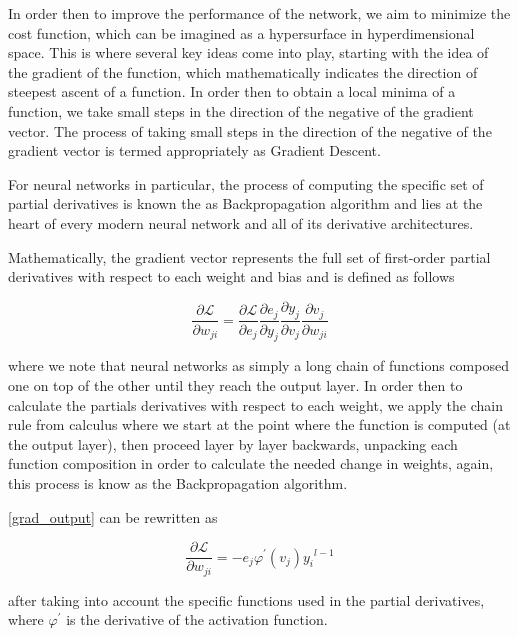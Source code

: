 \documentclass{article} %
\theoremstyle{definition}
\theoremstyle{remark}
\theoremstyle{plain}
\begin{document}
In order then to improve the performance of the network, we aim to minimize the cost function, which can be imagined as a hypersurface in hyperdimensional space. This is where several key ideas come into play, starting with the idea of the gradient of the function, which mathematically indicates the direction of steepest ascent of a function. In order then to obtain a local minima of a function, we take small steps in the direction of the negative of the gradient vector. The process of taking small steps in the direction of the negative of the gradient vector is termed appropriately as Gradient Descent.


For neural networks in particular, the process of computing the specific set of partial derivatives is known the as Backpropagation algorithm and lies at the heart of every modern neural network and all of its derivative architectures.


Mathematically, the gradient vector represents the full set of first-order partial derivatives with respect to each weight and bias and is defined as follows

\begin{equation}\label{grad_output}
	\frac{\partial \mathcal{L}}{\partial w_{j i}}=\frac{\partial \mathcal{L}}{\partial e_j} \frac{\partial e_j}{\partial y_j} \frac{\partial y_j}{\partial v_j} \frac{\partial v_j}{\partial w_{j i}}
\end{equation}

where we note that neural networks as simply a long chain of functions composed one on top of the other until they reach the output layer. In order then to calculate the partials derivatives with respect to each weight, we apply the chain rule from calculus where we start at the point where the function is computed (at the output layer), then proceed layer by layer backwards, unpacking each function composition in order to calculate the needed change in weights, again, this process is know as the Backpropagation algorithm.

\autoref{grad_output} can be rewritten as

\begin{equation}\label{grad_output_simp}
	\frac{\partial \mathcal{L}}{\partial w_{j i}}=-e_j \varphi^{\prime}\left(v_j\right) {y_i}^{l-1}
\end{equation}

after taking into account the specific functions used in the partial derivatives, where $\varphi^{\prime}$ is the derivative of the activation function.
\end{document}
